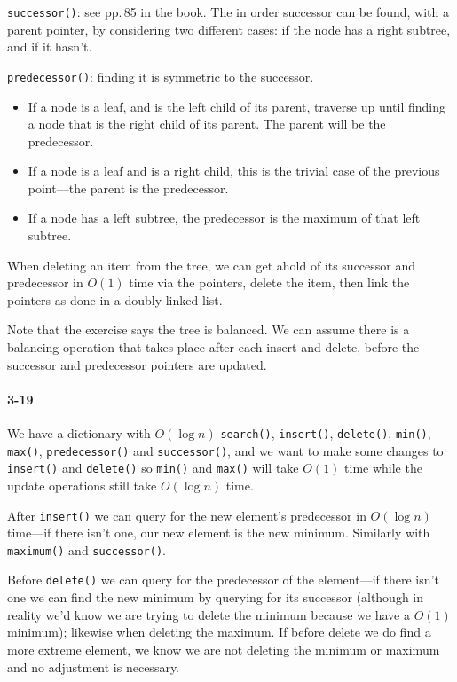 \documentclass{report}
\begin{document}

\lstinline!successor()!: see pp.\,85 in the book. The in order successor can be found, with a parent pointer, by considering two different cases: if the node has a right subtree, and if it hasn't.

\lstinline!predecessor()!: finding it is symmetric to the successor.
\begin{itemize}
	\item If a node is a leaf, and is the left child of its parent, traverse up until finding a node that is the right child of its parent. The parent will be the predecessor.
	\item If a node is a leaf and is a right child, this is the trivial case of the previous point---the parent is the predecessor.
	\item If a node has a left subtree, the predecessor is the maximum of that left subtree.
\end{itemize}

When deleting an item from the tree, we can get ahold of its successor and predecessor in $O(1)$ time via the pointers, delete the item, then link the pointers as done in a doubly linked list.

Note that the exercise says the tree is balanced. We can assume there is a balancing operation that takes place after each insert and delete, before the successor and predecessor pointers are updated.

\paragraph{3-19} We have a dictionary with $O(\log n)$ \lstinline!search()!, \lstinline!insert()!, \lstinline!delete()!, \lstinline!min()!, \lstinline!max()!, \lstinline!predecessor()! and \lstinline!successor()!, and we want to make some changes to \lstinline!insert()! and \lstinline!delete()! so \lstinline!min()! and \lstinline!max()! will take $O(1)$ time while the update operations still take $O(\log n)$ time.

After \lstinline!insert()! we can query for the new element's predecessor in $O(\log n)$ time---if there isn't one, our new element is the new minimum. Similarly with \lstinline!maximum()! and \lstinline!successor()!.

Before \lstinline!delete()! we can query for the predecessor of the element---if there isn't one we can find the new minimum by querying for its successor (although in reality we'd know we are trying to delete the minimum because we have a $O(1)$ minimum); likewise when deleting the maximum. If before delete we do find a more extreme element, we know we are not deleting the minimum or maximum and no adjustment is necessary.
\end{document}
